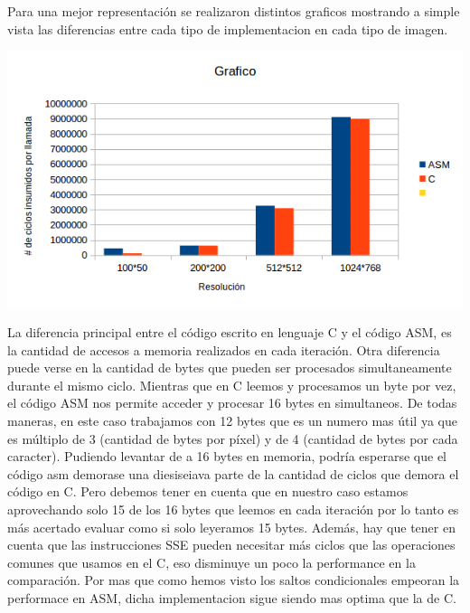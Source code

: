  Para una mejor representación se realizaron distintos graficos mostrando a simple vista
 las diferencias entre cada tipo de implementacion en cada tipo de imagen.
 \vspace*{0.3cm} \vspace*{0.3cm}
  \begin{center}
 \includegraphics[scale=0.8]{asmc.png}
 \end{center}
  \vspace*{0.3cm} 
  
  La diferencia principal entre el c\'odigo escrito en lenguaje C y el c\'odigo ASM, es la cantidad de accesos 
a memoria realizados en cada iteraci\'on. Otra diferencia puede verse en la cantidad de bytes que pueden 
ser procesados simultaneamente durante el mismo ciclo. 
Mientras que en C leemos y procesamos un byte por vez, el c\'odigo ASM nos permite acceder y procesar 
16 bytes en simultaneos. De todas maneras, en este caso trabajamos con 12 bytes que es un numero mas \'util 
ya que es m\'ultiplo de 3 (cantidad de bytes por p\'ixel)  y de 4 (cantidad de bytes por cada caracter).
Pudiendo levantar de a 16 bytes en memoria, podr\'ia esperarse que el c\'odigo asm demorase una 
diesiseiava parte de la cantidad de ciclos que demora el c\'odigo en C.
Pero debemos tener en cuenta que en nuestro caso estamos aprovechando solo 15 de los 16 bytes que leemos 
en cada iteraci\'on por lo tanto es más acertado evaluar como si solo leyeramos 15 bytes. 
Adem\'as, hay que tener en cuenta que las instrucciones SSE pueden necesitar más ciclos que las operaciones 
comunes que usamos en el C, eso disminuye un poco la performance en la comparación. 
Por mas que como hemos visto los saltos condicionales empeoran la performace en ASM, dicha implementacion
sigue siendo mas optima que la de C.
\vspace*{0.3cm} \vspace*{0.3cm} 
